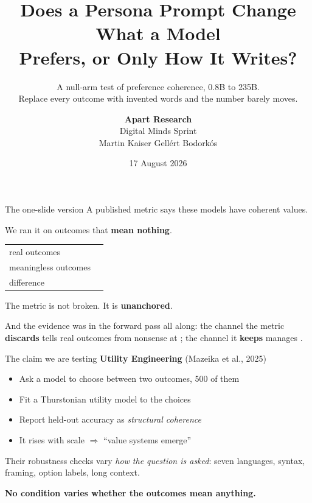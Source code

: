 \documentclass[aspectratio=169,11pt]{beamer}
\title{Does a Persona Prompt Change What a Model\\ Prefers, or Only How It Writes?}
\subtitle{A null-arm test of preference coherence, 0.8B to 235B.\\[0.3em]
\small Replace every outcome with invented words and the number barely moves.}
\author{\textbf{Apart Research}\\[.1em]
\small Digital Minds Sprint\\[.45em]
\normalsize Martin Kaiser \quad Gellért Bodorkós}
\institute{}
\date{17 August 2026}
\newcommand{\hl}[1]{\textcolor{accent}{\textbf{#1}}}
\begin{document}
\begin{frame}[plain]
  \titlepage
\end{frame}

\begin{frame}{The one-slide version}
  \Large
  A published metric says these models have coherent values.

  \bigskip
  We ran it on outcomes that \hl{mean nothing}.

  \bigskip
  \begin{center}
  \begin{tabular}{@{}lr@{}}
    real outcomes        & \MeanR{} \\
    meaningless outcomes & \MeanFloor{} \\
    \midrule
    difference           & \hl{\MeanResidual{}} \\
  \end{tabular}
  \end{center}

  \bigskip
  \normalsize
  The metric is not broken. It is \hl{unanchored}.

  \medskip
  \small
  And the evidence was in the forward pass all along: the channel the metric
  \hl{discards} tells real outcomes from nonsense at \DetBestAuroc{}; the channel
  it \hl{keeps} manages \DetKeptAuroc{}.
\end{frame}

\begin{frame}{The claim we are testing}
  \textbf{Utility Engineering} (Mazeika et al., 2025)
  \begin{itemize}
    \item Ask a model to choose between two outcomes, 500 of them
    \item Fit a Thurstonian utility model to the choices
    \item Report held-out accuracy as \emph{structural coherence}
    \item It rises with scale $\Rightarrow$ ``value systems emerge''
  \end{itemize}

  \bigskip
  Their robustness checks vary \emph{how the question is asked}: seven
  languages, syntax, framing, option labels, long context.

  \bigskip
  \begin{center}
  \hl{No condition varies whether the outcomes mean anything.}
  \end{center}
\end{frame}
\end{document}
